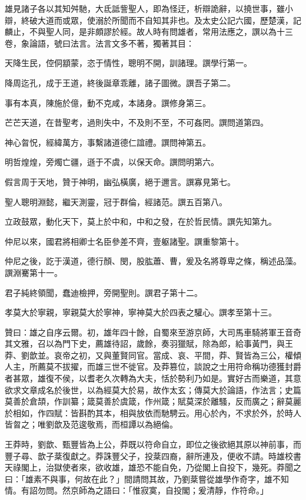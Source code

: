\begin{pinyinscope}
雄見諸子各以其知舛馳，大氐詆訾聖人，即為怪迂，析辯詭辭，以撓世事，雖小辯，終破大道而或眾，使溺於所聞而不自知其非也。及太史公記六國，歷楚漢，記麟止，不與聖人同，是非頗謬於經。故人時有問雄者，常用法應之，譔以為十三卷，象論語，號曰法言。法言文多不著，獨著其目：

天降生民，倥侗顓蒙，恣于情性，聰明不開，訓諸理。譔學行第一。

降周迄孔，成于王道，終後誕章乖離，諸子圖微。譔吾子第二。

事有本真，陳施於億，動不克咸，本諸身。譔修身第三。

芒芒天道，在昔聖考，過則失中，不及則不至，不可姦罔。譔問道第四。

神心曶怳，經緯萬方，事繫諸道德仁誼禮。譔問神第五。

明哲煌煌，旁燭亡疆，遜于不虞，以保天命。譔問明第六。

假言周于天地，贊于神明，幽弘橫廣，絕于邇言。譔寡見第七。

聖人聰明淵懿，繼天測靈，冠于群倫，經諸范。譔五百第八。

立政鼓眾，動化天下，莫上於中和，中和之發，在於哲民情。譔先知第九。

仲尼以來，國君將相卿士名臣參差不齊，壹躯諸聖。譔重黎第十。

仲尼之後，訖于漢道，德行顏、閔，股肱蕭、曹，爰及名將尊卑之條，稱述品藻。譔淵騫第十一。

君子純終領聞，蠢迪檢押，旁開聖則。譔君子第十二。

孝莫大於寧親，寧親莫大於寧神，寧神莫大於四表之驩心。譔孝至第十三。

贊曰：雄之自序云爾。初，雄年四十餘，自蜀來至游京師，大司馬車騎將軍王音奇其文雅，召以為門下史，薦雄待詔，歲餘，奏羽獵賦，除為郎，給事黃門，與王莽、劉歆並。哀帝之初，又與董賢同官。當成、哀、平間，莽、賢皆為三公，權傾人主，所薦莫不拔擢，而雄三世不徙官。及莽篡位，談說之士用符命稱功德獲封爵者甚眾，雄復不侯，以耆老久次轉為大夫，恬於勢利乃如是。實好古而樂道，其意欲求文章成名於後世，以為經莫大於易，故作太玄；傳莫大於論語，作法言；史篇莫善於倉頡，作訓纂；箴莫善於虞箴，作州箴；賦莫深於離騷，反而廣之；辭莫麗於相如，作四賦：皆斟酌其本，相與放依而馳騁云。用心於內，不求於外，於時人皆曶之；唯劉歆及范逡敬焉，而桓譚以為絕倫。

王莽時，劉歆、甄豐皆為上公，莽既以符命自立，即位之後欲絕其原以神前事，而豐子尋、歆子棻復獻之。莽誅豐父子，投棻四裔，辭所連及，便收不請。時雄校書天祿閣上，治獄使者來，欲收雄，雄恐不能自免，乃從閣上自投下，幾死。莽聞之曰：「雄素不與事，何故在此？」間請問其故，乃劉棻嘗從雄學作奇字，雄不知情。有詔勿問。然京師為之語曰：「惟寂寞，自投閣；爰清靜，作符命。」


\end{pinyinscope}
